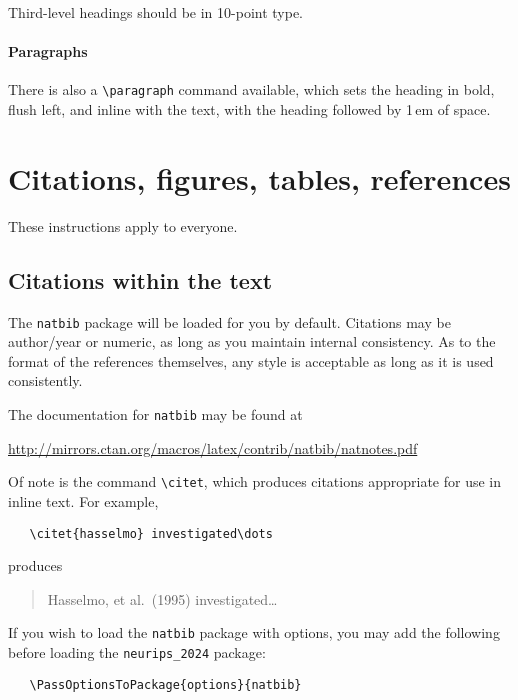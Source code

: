 \documentclass{article}
\begin{document}
Third-level headings should be in 10-point type.


\paragraph{Paragraphs}


There is also a \verb+\paragraph+ command available, which sets the heading in
bold, flush left, and inline with the text, with the heading followed by 1\,em
of space.


\section{Citations, figures, tables, references}
\label{others}


These instructions apply to everyone.


\subsection{Citations within the text}


The \verb+natbib+ package will be loaded for you by default.  Citations may be
author/year or numeric, as long as you maintain internal consistency.  As to the
format of the references themselves, any style is acceptable as long as it is
used consistently.


The documentation for \verb+natbib+ may be found at
\begin{center}
  \url{http://mirrors.ctan.org/macros/latex/contrib/natbib/natnotes.pdf}
\end{center}
Of note is the command \verb+\citet+, which produces citations appropriate for
use in inline text.  For example,
\begin{verbatim}
   \citet{hasselmo} investigated\dots
\end{verbatim}
produces
\begin{quote}
  Hasselmo, et al.\ (1995) investigated\dots
\end{quote}


If you wish to load the \verb+natbib+ package with options, you may add the
following before loading the \verb+neurips_2024+ package:
\begin{verbatim}
   \PassOptionsToPackage{options}{natbib}
\end{verbatim}
\end{document}
